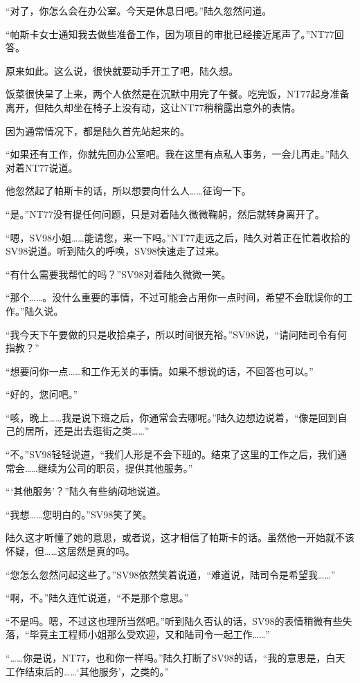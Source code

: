 “对了，你怎么会在办公室。今天是休息日吧。”陆久忽然问道。

“帕斯卡女士通知我去做些准备工作，因为项目的审批已经接近尾声了。”NT77回答。

原来如此。这么说，很快就要动手开工了吧，陆久想。

饭菜很快呈了上来，两个人依然是在沉默中用完了午餐。吃完饭，NT77起身准备离开，但陆久却坐在椅子上没有动，这让NT77稍稍露出意外的表情。

因为通常情况下，都是陆久首先站起来的。

“如果还有工作，你就先回办公室吧。我在这里有点私人事务，一会儿再走。”陆久对着NT77说道。

他忽然起了帕斯卡的话，所以想要向什么人……征询一下。

“是。”NT77没有提任何问题，只是对着陆久微微鞠躬，然后就转身离开了。

“嗯，SV98小姐……能请您，来一下吗。”NT77走远之后，陆久对着正在忙着收拾的SV98说道。听到陆久的呼唤，SV98快速走了过来。

“有什么需要我帮忙的吗？”SV98对着陆久微微一笑。

“那个……。没什么重要的事情，不过可能会占用你一点时间，希望不会耽误你的工作。”陆久说。

“我今天下午要做的只是收拾桌子，所以时间很充裕。”SV98说，“请问陆司令有何指教？”

“想要问你一点……和工作无关的事情。如果不想说的话，不回答也可以。”

“好的，您问吧。”

“咳，晚上……我是说下班之后，你通常会去哪呢。”陆久边想边说着，“像是回到自己的居所，还是出去逛街之类……”

“不。”SV98轻轻说道，“我们人形是不会下班的。结束了这里的工作之后，我们通常会……继续为公司的职员，提供其他服务。”

“‘其他服务’？”陆久有些纳闷地说道。

“我想……您明白的。”SV98笑了笑。

陆久这才听懂了她的意思，或者说，这才相信了帕斯卡的话。虽然他一开始就不该怀疑，但……这居然是真的吗。

“您怎么忽然问起这些了。”SV98依然笑着说道，“难道说，陆司令是希望我……”

“啊，不。”陆久连忙说道，“不是那个意思。”

“不是吗。嗯，不过这也理所当然吧。”听到陆久否认的话，SV98的表情稍微有些失落，“毕竟主工程师小姐那么受欢迎，又和陆司令一起工作……”

“……你是说，NT77，也和你一样吗。”陆久打断了SV98的话，“我的意思是，白天工作结束后的……‘其他服务’，之类的。”

